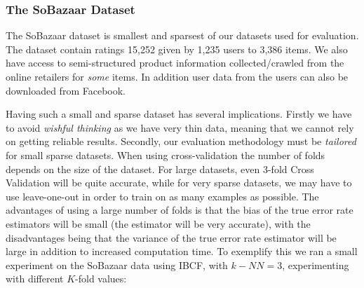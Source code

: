 %

\subsubsection{The SoBazaar Dataset}

The SoBazaar dataset is smallest and sparsest of our datasets used for evaluation.
The dataset contain ratings 15,252 given by 1,235 users to 3,386 items.
We also have access to semi-structured product information collected/crawled from
the online retailers for \emph{some} items. In addition user data from the users
can also be downloaded from Facebook.

Having such a small and sparse dataset has several implications. Firstly we have
to avoid \emph{wishful thinking} as we have very thin data, meaning that we cannot
rely on getting reliable results. Secondly, our evaluation methodology must be
\emph{tailored} for small sparse datasets. When using cross-validation the number
of folds depends on the size of the dataset. For large datasets, even 3-fold Cross
Validation will be quite accurate, while for very sparse datasets, we may have to
use leave-one-out in order to train on as many examples as possible. The advantages
of using a large number of folds is that the bias of the true error rate estimators
will be small (the estimator will be very accurate), with the disadvantages being that
the variance of the true error rate estimator will be large in addition to increased
computation time. To exemplify this we ran a small experiment on the SoBazaar data using
IBCF, with $k-NN=3$, experimenting with different $K$-fold values:

